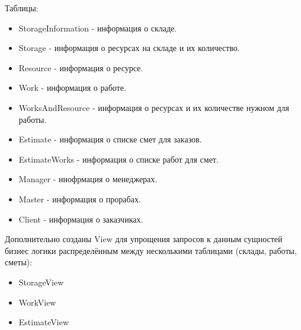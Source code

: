 \documentclass[12pt,a4paper,titlepage]{article}
\begin{document}
Таблицы:
\begin{itemize}
\item StorageInformation - информация о складе.
\item Storage - информация о ресурсах на складе и их количество.
\item Resource - информация о ресурсе. 
\item Work - информация о работе.
\item WorksAndResource - информация о ресурсах и их количестве нужном для работы.
\item Estimate - информация о списке смет для заказов.
\item EstimateWorks - информация о списке работ для смет.
\item Manager - инофрмация о менеджерах.
\item Master - информация о прорабах.
\item Client - информация о заказчиках.
\end{itemize}
Дополнительно созданы View для упрощения запросов к данным сущностей бизнес логики распределённым между несколькими таблицами (склады, работы, сметы):
\begin{itemize}
\item StorageView
\item WorkView
\item EstimateView
\end{itemize}
\newpage
\end{document}
